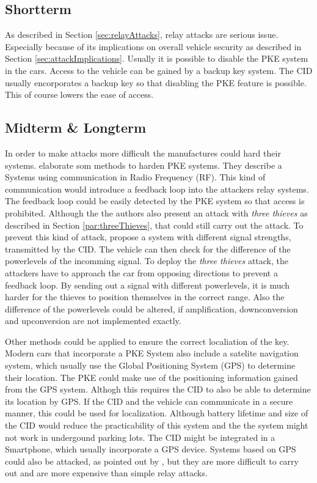
\subsection{Shortterm}
	As described in Section \ref{sec:relayAttacks}, relay attacks are serious issue.
	Especially because of its implications on overall vehicle security as described in Section \ref{sec:attackImplications}.
	Usually it is possible to disable the PKE system in the cars.
	Access to the vehicle can be gained by a backup key system.
	The CID usually encorporates a backup key so that disabling the PKE feature is possible.
	This of course lowers the ease of access.

\subsection{Midterm \& Longterm}
	In order to make attacks more difficult the manufactures could hard their systems.
	\citeauthor{someAttacksPKES} elaborate som methods to harden PKE systems.
	They describe a Systems using communication in Radio Frequency (RF).
	This kind of communication would introduce a feedback loop into the attackers relay systems.
	The feedback loop could be easily detected by the PKE system so that access is prohibited.
	Although the the authors also present an attack with \textsl{three thieves}
	as described in Section \ref{par:threeThieves}, that could still
	carry out the attack.
	To prevent this kind of attack,
	\citeauthor{someAttacksPKES} propose a system with different signal strengths,
	transmitted by the CID.
	The vehicle can then check for the difference of the powerlevels of the incomming signal.
	To deploy the \textsl{three thieves} attack,
	the attackers have to approach the car from opposing directions to prevent a feedback loop.
	By sending out a signal with different powerlevels,
	it is much harder for the thieves to position themselves in the correct range.
	Also the difference of the powerlevels could be altered,
	if amplification, downconversion and upconversion are not implemented exactly.

	Other methods could be applied to ensure the correct localiation of the key.
	Modern cars that incorporate a PKE System also include a satelite navigation system,
	which usually use the Global Positioning System (GPS) to determine their location.
	The PKE could make use of the positioning information gained from the GPS system.
	Althogh this requires the CID to also be able to determine its location by GPS.
	If the CID and the vehicle can communicate in a secure manner,
	this could be used for localization.
	Although battery lifetime and size of the CID would reduce the practicability of this system
	and the the system might not work in undergound parking lots.
	The CID might be integrated in a Smartphone,
	which usually incorporate a GPS device.
	Systems based on GPS could also be attacked,
	as pointed out by \cite{someAttacksPKES},
	but they are more difficult to carry out and are more expensive than simple relay attacks.

